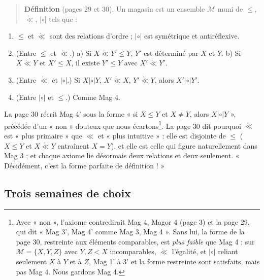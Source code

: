 \documentclass[11pt,a4paper]{article}
\begin{document}
\begin{quote}
\textbf{Définition} (pages 29 et 30). Un magasin est un ensemble $\mathcal{M}$
muni de $\leq$, $\mathring{\ll}$, $\mathrel{|\circ|}$ tels que :
\end{quote}
\begin{enumerate}
\item[Mag 1'.] $\leq$ et $\mathring{\ll}$ sont des relations d'ordre ;
$\mathrel{|\circ|}$ est symétrique et antiréflexive.
\item[Mag 2'.] (Entre $\leq$ et $\mathring{\ll}$.) a) Si $X
\mathrel{\mathring{\ll}} Y' \leq Y$, $Y'$ est déterminé par $X$ et $Y$. b) Si
$X \mathrel{\mathring{\ll}} Y$ et $X' \leq X$, il existe $Y' \leq Y$ avec $X'
\mathrel{\mathring{\ll}} Y'$.
\item[Mag 3'.] (Entre $\mathring{\ll}$ et $\mathrel{|\circ|}$.) Si $X
\mathrel{|\circ|} Y$, $X' \mathrel{\mathring{\ll}} X$, $Y'
\mathrel{\mathring{\ll}} Y$, alors $X' \mathrel{|\circ|} Y'$.
\item[Mag 4'.] (Entre $\mathrel{|\circ|}$ et $\leq$.) Comme Mag 4.
\end{enumerate}


La page 30 récrit Mag 4' sous la forme « si $X \leq Y$ et $X \neq Y$, alors $X
\mathrel{|\circ|} Y$ », précédée d'un « non » douteux que nous
écartons\footnote{Avec « non », l'axiome contredirait Mag 4, Magor 4 (page 3) et
la page 29, qui dit « Mag 3', Mag 4' comme Mag 3, Mag 4 ». Sans lui, la forme
de la page 30, restreinte aux éléments comparables, est \emph{plus faible} que
Mag 4 : sur $\mathcal{M} = \{X, Y, Z\}$ avec $Y, Z < X$ incomparables,
$\mathring{\ll}$ l'égalité, et $\mathrel{|\circ|}$ reliant seulement $X$ à $Y$
et à $Z$, Mag 1' à 3' et la forme restreinte sont satisfaits, mais pas Mag 4.
Nous gardons Mag 4.}. La page 30 dit pourquoi $\mathring{\ll}$ est « plus
primaire » que $\ll$ et « plus intuitive » : elle est disjointe de $\leq$
($X \leq Y$ et $X \mathrel{\mathring{\ll}} Y$ entraînent $X = Y$), et elle est
celle qui figure naturellement dans Mag 3 ; et chaque axiome lie désormais deux
relations et deux seulement. « Décidément, c'est la forme parfaite de
définition ! »

\subsection*{Trois semaines de choix}
\end{document}
